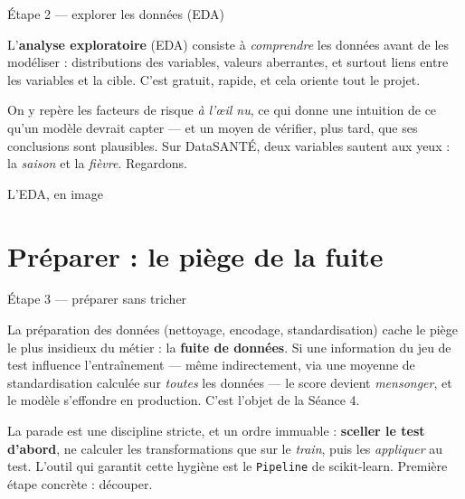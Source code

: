 \documentclass[aspectratio=169,11pt]{beamer}
\begin{document}
\begin{frame}{Étape 2 — explorer les données (EDA)}
\begin{ucaddef}
{\small L'\textbf{analyse exploratoire} (EDA) consiste à \emph{comprendre} les données avant de les modéliser : distributions des variables, valeurs aberrantes, et surtout liens entre les variables et la cible. C'est gratuit, rapide, et cela oriente tout le projet.}
\end{ucaddef}
{\small On y repère les facteurs de risque \emph{à l'œil nu}, ce qui donne une intuition de ce qu'un modèle devrait capter — et un moyen de vérifier, plus tard, que ses conclusions sont plausibles. Sur DataSANTÉ, deux variables sautent aux yeux : la \emph{saison} et la \emph{fièvre}. Regardons.}
\end{frame}

\begin{frame}{L'EDA, en image}
\end{frame}

\section{Préparer : le piège de la fuite}

\begin{frame}{Étape 3 — préparer sans tricher}
\begin{ucadfront}
{\small La préparation des données (nettoyage, encodage, standardisation) cache le piège le plus insidieux du métier : la \textbf{fuite de données}. Si une information du jeu de test influence l'entraînement — même indirectement, via une moyenne de standardisation calculée sur \emph{toutes} les données — le score devient \emph{mensonger}, et le modèle s'effondre en production. C'est l'objet de la Séance 4.}
\end{ucadfront}
{\small La parade est une discipline stricte, et un ordre immuable : \textbf{sceller le test d'abord}, ne calculer les transformations que sur le \emph{train}, puis les \emph{appliquer} au test. L'outil qui garantit cette hygiène est le \texttt{Pipeline} de scikit-learn. Première étape concrète : découper.}
\end{frame}
\end{document}
